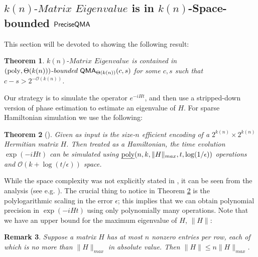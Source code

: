 \documentclass[11pt]{article}
\newtheorem{theorem}{Theorem}
\newtheorem{remark}[theorem]{Remark}
\theoremstyle{definition}
\theoremstyle{remark}
\newcommand\QMA{{\sf{QMA}}}
\newcommand\QMAexp{{\sf{PreciseQMA}}}
\newcommand\bddQMA[5]{{\left(#1,#2\right)}\textit{-bounded }\QMA_{#3}(#4,#5)}
\newcommand\spechamiltonian[1]{#1\textit{-Matrix Eigenvalue}}
\newcommand\bigoh{\mathcal{O}}
\newcommand{\poly}{\textrm{poly}}
\begin{document}
\subsection{$\spechamiltonian{k(n)}$ is in $k(n)$-Space-bounded $\QMAexp$}\label{subsec:specham-in-bddqma}
This section will be devoted to showing the following result:
\begin{theorem} \label{lem:qma protocol}
$\spechamiltonian{k(n)}$ is contained in $\bddQMA{\poly}{\Theta(k(n))}{\Theta(k(n))}{c}{s}$ for some $c,s$ such that $c - s > 2^{-\mathcal{O}(k(n))}$.
\end{theorem}
Our strategy is to simulate the operator $e^{-iHt}$, and then use a stripped-down version of phase estimation to estimate an eigenvalue of $H$. For sparse Hamiltonian simulation we use the following:
\begin{theorem}[\cite{berry14,bccks15,berry15}] \label{thm:ham_sim}
Given as input is the size-$n$ efficient encoding of a $2^{k(n)} \times 2^{k(n)}$ Hermitian matrix $H$. Then treated as a Hamiltonian, the time evolution $\exp(-iHt)$ can be simulated using $\text{\emph{poly}}(n,k,\|H\|_{max}, t, \log(1/\epsilon))$ operations and $\bigoh(k+\log(t/\epsilon))$ space.
\end{theorem}
While the space complexity was not explicitly stated in \cite{berry14,bccks15,berry15}, it can be seen from the analysis (see e.g. \cite{bccks15}). The crucial thing to notice in Theorem \ref{thm:ham_sim} is the polylogarithmic scaling in the error $\epsilon$; this implies that we can obtain polynomial precision in $\exp(-iHt)$ using only polynomially many operations. Note that we have an upper bound for the maximum eigenvalue of $H$, $\|H\|$:
\begin{remark}
Suppose a matrix $H$ has at most $n$ nonzero entries per row, each of which is no more than $\|H\|_{max}$ in absolute value. Then $\| H \| \le n\|H\|_{max}$.
\end{remark}
\end{document}
